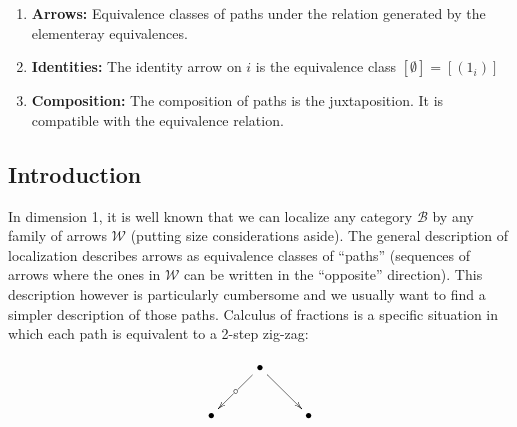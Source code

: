 \documentclass{article}
\numberwithin{equation}{section}
\theoremstyle{definition}
\theoremstyle{plain}
\begin{document}
\begin{enumerate}[label = $\bullet$]
\begin{enumerate}[label = $(\roman*)$]
		\item \textbf{Composing:} for all $1 \le k \le n-1$, if $u_k, u_{k+1} \in \mathcal{I}_1$, \[(u_1, \dots, u_n) \sim (u_1, \dots, u_{k+1} \circ u_k, \dots, u_n)\]
		\item \textbf{Right Inverse:} for all $0 \le k \le n$, and for all $w \in \mathcal{W}_{\mathcal{I}}$, \[(u_1, \dots, u_n) \sim (u_1, \dots, u_k, w^{-1}, w, u_{k+1}, \dots, u_n)\]
		\item \textbf{Left Inverse:} for all $0 \le k \le n$, and for all $w \in \mathcal{W}_{\mathcal{I}}$, \[(u_1, \dots, u_n) \sim (u_1, \dots, u_k, w, w^{-1}, u_{k+1}, \dots, u_n)\]
	\end{enumerate}
	\item \textbf{Arrows:} Equivalence classes of paths under the relation generated by the elementeray equivalences.
	\item \textbf{Identities:} The identity arrow on $i$ is the equivalence class $[\emptyset] = [(1_i)]$
	\item \textbf{Composition:} The composition of paths is the juxtaposition. It is compatible with the equivalence relation.
\end{enumerate}

\subsection{Introduction}

In dimension 1, it is well known that we can localize any category $\mathcal{B}$ by any family of arrows $\mathcal{W}$ (putting size considerations aside). The general description of localization describes arrows as equivalence classes of ``paths'' (sequences of arrows where the ones in $\mathcal{W}$ can be written in the ``opposite'' direction). This description however is particularly cumbersome and we usually want to find a simpler description of those paths. Calculus of fractions is a specific situation in which each path is equivalent to a 2-step zig-zag:

\[\xymatrix{
	& \bullet \ar[dr] \ar[dl]|{\circ}\\
	\bullet && \bullet
}\]
\end{document}
